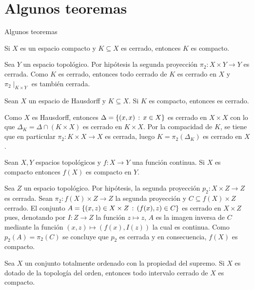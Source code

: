 \documentclass[10pt]{beamer}
\begin{document}
  \section{Algunos teoremas}
\begin{frame}{Algunos teoremas}
  
    \begin{theorem}
  Si $X$ es un espacio compacto y $K\subseteq X$ es cerrado,
  entonces $K$ es compacto.
\end{theorem}
Sea $Y$ un espacio topológico. Por hipótesis la segunda proyección
  $\pi_2:X\times Y\longrightarrow Y$  es cerrada. Como $K$ es cerrado,
  entonces todo cerrado de $K$ es cerrado en $X$ y $\pi_2\mid_{K\times Y}$
  es también cerrada.
\end{frame}
\begin{frame}
  \begin{theorem}
  Sean $X$ un espacio de Hausdorff y $K\subseteq X$. Si $K$ es compacto,
  entonces es cerrado.
\end{theorem}
Como $X$ es Hausdorff, entonces $\Delta=\left\{(x,x)\,:\,x\in X\right\}$ es cerrado en $X\times X$
  con lo que $\Delta_K=\Delta\cap(K\times X)$ es cerrado en $K\times X$. Por la compacidad
  de $K$, se tiene que en particular $\pi_2:K\times X\longrightarrow X$ es cerrada, luego
  $K=\pi_2(\Delta_K)$ es cerrado en $X$.
\end{frame}
\begin{frame}
  \begin{theorem}
  Sean $X,Y$ espacios topológicos y $f:X\longrightarrow Y$ una función continua.
  Si $X$ es compacto entonces $f(X)$ es compacto en $Y$.
\end{theorem}


  Sea $Z$ un espacio topológico. Por hipótesis, la segunda proyección
  $p_2:X\times Z\longrightarrow Z$ es cerrada. Sean $\pi_2:f(X)\times Z\longrightarrow Z$
  la segunda proyección y $C\subseteq f(X)\times Z$ cerrado. El conjunto
  $A=\left\{(x,z)\in X\times Z\,:\,(f(x),z)\in C\right\}$ es cerrado en $X\times Z$ pues,
  denotando por $I:Z\longrightarrow Z$ la función $z\longmapsto z$,
  $A$ es la imagen inversa de $C$ mediante la función $(x,z)\longmapsto(f(x),I(z))$ la cual
  es continua. Como $p_2(A)=\pi_2(C)$ se concluye que $p_2$ es cerrada y en consecuencia,
  $f(X)$ es compacto.
\end{frame}
\begin{frame}
  \begin{theorem}
  Sea $X$ un conjunto totalmente ordenado con la propiedad del supremo. Si $X$
  es dotado de la topología del orden, entonces todo intervalo cerrado de $X$
  es compacto.
\end{theorem}

\end{frame}
\end{document}
